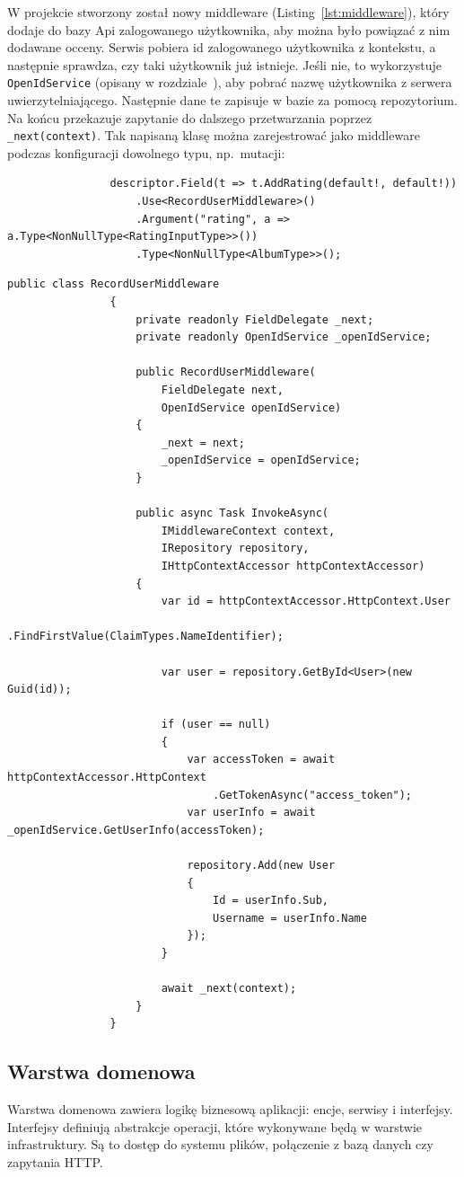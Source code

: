 			W projekcie stworzony został nowy middleware (Listing~\ref{lst:middleware}), który dodaje do bazy Api zalogowanego użytkownika, aby można było powiązać z nim dodawane occeny.
			Serwis pobiera id zalogowanego użytkownika z kontekstu, a następnie sprawdza, czy taki użytkownik już istnieje.
			Jeśli nie, to wykorzystuje \verb|OpenIdService| (opisany w rozdziale~),
			aby pobrać nazwę użytkownika z serwera uwierzytelniającego.
			Następnie dane te zapisuje w bazie za pomocą repozytorium.
			Na końcu przekazuje zapytanie do dalszego przetwarzania poprzez \verb|_next(context)|.
			Tak napisaną klasę można zarejestrować jako middleware podczas konfiguracji dowolnego typu, np.\ mutacji:
			\begin{lstlisting}
				descriptor.Field(t => t.AddRating(default!, default!))
					.Use<RecordUserMiddleware>()
					.Argument("rating", a => a.Type<NonNullType<RatingInputType>>())
					.Type<NonNullType<AlbumType>>();
			\end{lstlisting}

			\begin{lstlisting}[label=lst:middleware, caption=Middleware zapisujące użytkowników, float]
				public class RecordUserMiddleware
				{
					private readonly FieldDelegate _next;
					private readonly OpenIdService _openIdService;
			
					public RecordUserMiddleware(
						FieldDelegate next,
						OpenIdService openIdService)
					{
						_next = next;
						_openIdService = openIdService;
					}
			
					public async Task InvokeAsync(
						IMiddlewareContext context,
						IRepository repository,
						IHttpContextAccessor httpContextAccessor)
					{
						var id = httpContextAccessor.HttpContext.User
							.FindFirstValue(ClaimTypes.NameIdentifier);
			
						var user = repository.GetById<User>(new Guid(id));
			
						if (user == null)
						{
							var accessToken = await httpContextAccessor.HttpContext
								.GetTokenAsync("access_token");
							var userInfo = await _openIdService.GetUserInfo(accessToken);
			
							repository.Add(new User
							{
								Id = userInfo.Sub,
								Username = userInfo.Name
							});
						}
			
						await _next(context);
					}
				}
			\end{lstlisting}

	\subsection{Warstwa domenowa}
		Warstwa domenowa zawiera logikę biznesową aplikacji: encje, serwisy i interfejsy.
		Interfejsy definiują abstrakcje operacji, które wykonywane będą w warstwie infrastruktury.
		Są to dostęp do systemu plików, połączenie z bazą danych czy zapytania HTTP.

